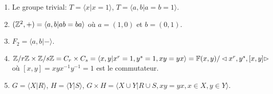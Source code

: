   \begin{exs}
    \begin{enumerate}
    \item Le groupe trivial: $T = \langle x | x = 1 \rangle$, $T = \langle a, b | a = b = 1 \rangle$.

    \item $(\mathbb{Z}^2, +) = \langle a, b | ab = ba \rangle$ où $a = (1,0)$ et $b=(0,1)$.
    \item $F_2 = \langle a,b | - \rangle$.
    \item $\mathbb{Z}/r\mathbb{Z} \times \mathbb{Z}/s\mathbb{Z} = C_r \times C_s = \langle x,y | x^r = 1, y^s = 1, xy = yx \rangle =
      \mathbb{F}(x,y)/\lhd x^r, y^s , [x,y] \rhd$ où $[x,y] = xyx^{-1}y^{-1} = 1$ est le commutateur.
    \item $G = \langle X | R \rangle$, $H = \langle Y | S \rangle$, $G \times H = \langle X \cup Y | R \cup S,
      xy = yx, x \in X, y \in Y \rangle$. \qedhere
    \end{enumerate}
  \end{exs}
  




